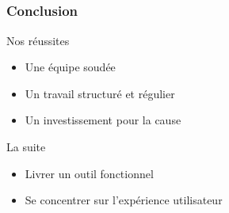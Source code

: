 


\subsection{} %

\speaker{\Pierre}
\begin{frame}
\frametitle{Conclusion}
\begin{block}{Nos réussites}
	\begin{itemize}
		\item Une équipe soudée
		\item Un travail structuré et régulier
		\item Un investissement pour la cause
	\end{itemize}
\end{block}
	
\begin{block}{La suite}
	\begin{itemize}
		\item Livrer un outil fonctionnel
		\item Se concentrer sur l’expérience utilisateur
	\end{itemize}
\end{block}
\end{frame}
